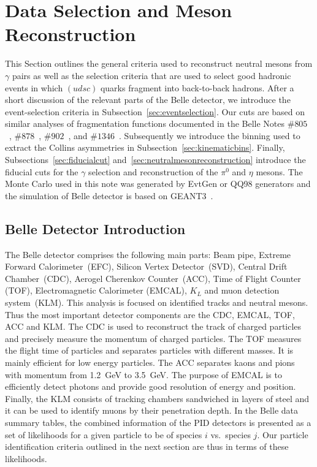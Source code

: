 \section{Data Selection and Meson Reconstruction}
\label{sec:dataselection}
This Section outlines the general criteria used to reconstruct neutral mesons from $\gamma$ pairs as well as the selection criteria that are used to select good hadronic events in which $(udsc)$ quarks fragment into back-to-back hadrons. After a short discussion of the relevant parts of the Belle detector, we introduce the event-selection criteria in Subsection~\ref{sec:eventselection}. Our cuts are based on similar analyses of fragmentation functions documented in the Belle Notes $\#805$~\cite{BelleNote1}, $\#878$~\cite{BelleNote2}, $\#902$~\cite{BelleNote3}, and $\#1346$~\cite{BelleNote4}. 
Subsequently we introduce the binning used to extract the Collins asymmetries in Subsection~\ref{sec:kinematicbins}.
Finally, Subsections~\ref{sec:fiducialcut} and~\ref{sec:neutralmesonreconstruction} introduce the fiducial cuts for the $\gamma$ selection and reconstruction of the $\pi^0$ and $\eta$ mesons.
The Monte Carlo used in this note was generated by EvtGen or QQ98 generators and the simulation of Belle detector is based on GEANT3~\cite{DetectorSimulation}. 

\subsection{Belle Detector Introduction}
The Belle detector comprises the following main parts: Beam pipe, Extreme Forward Calorimeter~(EFC), Silicon Vertex Detector~(SVD), Central Drift Chamber~(CDC), Aerogel Cherenkov Counter~(ACC), Time of Flight Counter (TOF), Electromagnetic Calorimeter (EMCAL), $K_L$ and muon detection system~(KLM).
 This analysis is focused on identified tracks and neutral mesons. Thus the most important detector components are the CDC,  EMCAL, TOF, ACC and KLM.
 The CDC is used to reconstruct the track of charged particles and precisely measure the momentum of charged particles.  The TOF measures the flight time of particles and separates particles with different masses. It is mainly efficient for low energy particles. The ACC separates kaons and pions with momentum from 1.2~GeV to 3.5~GeV. The purpose of EMCAL is to efficiently detect photons and provide good resolution of energy and position. Finally, the KLM consists of tracking chambers sandwiched in layers of steel and it can be used to identify muons by their penetration depth. In the Belle data summary tables, the combined information of the PID detectors is presented as a set of likelihoods for a given particle to be of species $i$ vs.~species $j$. Our particle identification criteria outlined in the next section are thus in terms of these likelihoods. 

